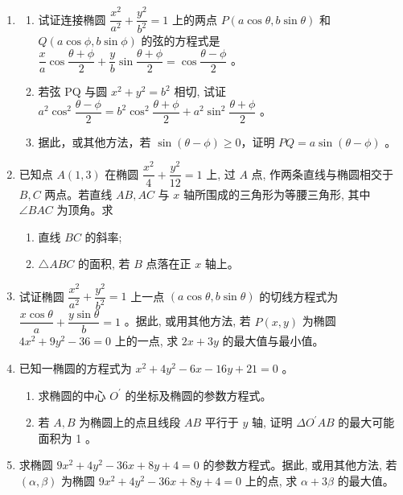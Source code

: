 \documentclass[10pt]{article}
\begin{document}
\begin{enumerate}
\item \begin{enumerate}
  \item 试证连接椭圆 $\dfrac{x^{2}}{a^{2}}+\dfrac{y^{2}}{b^{2}}=1$ 上的两点 $P(a \cos \theta, b \sin \theta)$ 和 $Q(a \cos \phi, b \sin \phi)$ 的弦的方程式是 $\dfrac{x}{a} \cos \dfrac{\theta+\phi}{2}+\dfrac{y}{b} \sin \dfrac{\theta+\phi}{2}=\cos \dfrac{\theta-\phi}{2}$ 。

  \item 若弦 PQ 与圆 $x^{2}+y^{2}=b^{2}$ 相切, 试证 $a^{2} \cos ^{2} \dfrac{\theta-\phi}{2}=b^{2} \cos ^{2} \dfrac{\theta+\phi}{2}+a^{2} \sin ^{2} \dfrac{\theta+\phi}{2}$ 。
  
  \item 据此，或其他方法，若 $\sin(\theta-\phi) \geq 0$，证明 $PQ = a \sin(\theta-\phi)$ 。
\end{enumerate}

\item 已知点 $A(1,3)$ 在椭圆 $\dfrac{x^{2}}{4}+\dfrac{y^{2}}{12}=1$ 上, 过 $A$ 点, 作两条直线与椭圆相交于 $B, C$ 两点。若直线 $AB, AC$ 与 $x$ 轴所围成的三角形为等腰三角形, 其中 $\angle BAC$ 为顶角。求
  \begin{enumerate}
    \item 直线 $BC$ 的斜率;
    \item $\triangle ABC$ 的面积, 若 $B$ 点落在正 $x$ 轴上。
  \end{enumerate}

\item 试证椭圆 $\dfrac{x^{2}}{a^{2}}+\dfrac{y^{2}}{b^{2}}=1$ 上一点 $(a \cos \theta, b \sin \theta)$ 的切线方程式为 $\dfrac{x \cos \theta}{a}+\dfrac{y \sin \theta}{b}=1$ 。据此, 或用其他方法, 若 $P(x, y)$ 为椭圆 $4 x^{2}+9 y^{2}-36=0$ 上的一点, 求 $2 x+3 y$ 的最大值与最小值。

\item 已知一椭圆的方程式为 $x^{2}+4 y^{2}-6 x-16 y+21=0$ 。
  \begin{enumerate}
    \item 求椭圆的中心 $O^{\prime}$ 的坐标及椭圆的参数方程式。
    \item 若 $A, B$ 为椭圆上的点且线段 $AB$ 平行于 $y$ 轴, 证明 $\Delta O^{\prime} AB$ 的最大可能面积为 1 。
  \end{enumerate}

\item 求椭圆 $9 x^{2}+4 y^{2}-36 x+8 y+4=0$ 的参数方程式。据此, 或用其他方法, 若 $(\alpha, \beta)$ 为椭圆 $9 x^{2}+4 y^{2}-36 x+8 y+4=0$ 上的点, 求 $\alpha+3 \beta$ 的最大值。


\end{enumerate}
\end{document}
